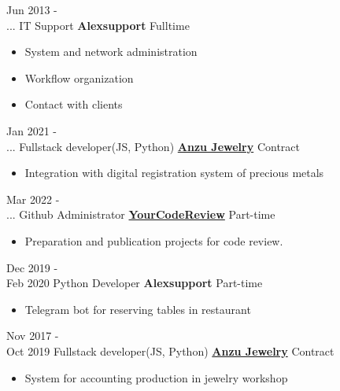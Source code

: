\documentclass[a4paper]{twentysecondcv} %
\begin{document}
\begin{twenty}
    \twentyitem
        {Jun 2013 - \\ ...}
        {IT Support}
        {\textbf{Alexsupport}}
        {Fulltime}
        {
            \begin{itemize}
                \item System and network administration
                \item Workflow organization
                \item Contact with clients
            \end{itemize}
        }
    \twentyitem
        {Jan 2021 - \\ ...}
        {Fullstack developer(JS, Python)}
        {\href{https://anzujewelry.com/}{\textbf{Anzu Jewelry}}}
        {Contract}
        {
            \begin{itemize}
                \item Integration with digital registration system of precious metals
            \end{itemize}
        }
    \twentyitem
        {Mar 2022 - \\ ...}
        {Github Administrator}
        {\href{https://yourcodereview.com/}{\textbf{YourCodeReview}}}
        {Part-time}
        {
            \begin{itemize}
                \item Preparation and publication projects for code review.
            \end{itemize}
        }
    \twentyitem
        {Dec 2019 - \\ Feb 2020}
        {Python Developer}
        {\textbf{Alexsupport}}
        {Part-time}
        {
            \begin{itemize}
                \item Telegram bot for reserving tables in restaurant
            \end{itemize}
        }
    \twentyitem
        {Nov 2017 - \\ Oct 2019}
        {Fullstack developer(JS, Python) }
        {\href{https://anzujewelry.com/}{\textbf{Anzu Jewelry}}}
        {Contract}
        {
            \begin{itemize}
                \item System for accounting production in jewelry workshop

\end{itemize}}
\end{twenty}
\end{document}
